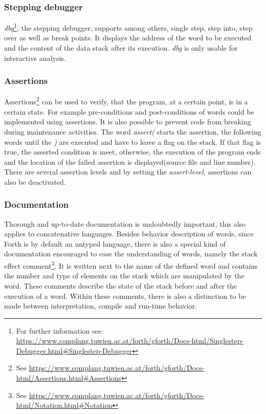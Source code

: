 \subsubsection*{Stepping debugger}
\emph{dbg}\footnote{For further information see: \url{https://www.complang.tuwien.ac.at/forth/gforth/Docs-html/Singlestep-Debugger.html\#Singlestep-Debugger}}, the stepping debugger, supports among others, single step, step into, step over as well as break points. It displays the address of the word to be executed and the content of the data stack after its execution. \emph{dbg} is only usable for interactive analysis.

\subsubsection*{Assertions}
Assertions\footnote{See \url{https://www.complang.tuwien.ac.at/forth/gforth/Docs-html/Assertions.html\#Assertions}} can be used to verify, that the program, at a certain point, is in a certain state. For example pre-conditions and post-conditions of words could be implemented using assertions. It is also possible to prevent code from breaking during maintenance activities. The word \emph{assert(} starts the assertion, the following words until the \emph{)} are executed and have to leave a flag on the stack. If that flag is true, the asserted condition is meet, otherwise, the execution of the program ends and the location of the failed assertion is displayed(source file and line number).\\
There are several assertion levels and by setting the \emph{assert-level}, assertions can also be deactivated.

\subsubsection*{Documentation}
Thorough and up-to-date documentation is undoubtedly important, this also applies to concatenative languages. Besides behavior description of words, since Forth is by default an untyped language, there is also a special kind of documentation encouraged to ease the understanding of words, namely the stack effect comment\footnote{See \url{https://www.complang.tuwien.ac.at/forth/gforth/Docs-html/Notation.html\#Notation}}. It is written next to the name of the defined word and contains the number and type of elements on the stack which are manipulated by the word. These comments describe the state of the stack before and after the execution of a word. Within these comments, there is also a distinction to be made between interpretation, compile and run-time behavior.

